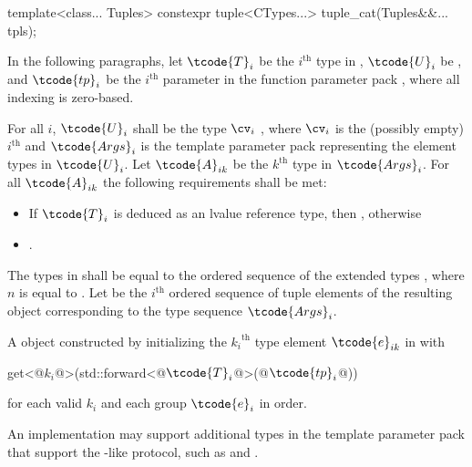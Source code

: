 \begin{itemdecl}
template<class... Tuples>
  constexpr tuple<CTypes...> tuple_cat(Tuples&&... tpls);
\end{itemdecl}

\begin{itemdescr}
\pnum
In the following paragraphs, let $\tcode{T}_i$ be the $i^\text{th}$ type in ,
$\tcode{U}_i$ be , and $\tcode{tp}_i$ be the $i^\text{th}$
parameter in the function parameter pack , where all indexing is
zero-based.

\pnum
\requires For all $i$, $\tcode{U}_i$ shall be the type
$\cv_i$ , where $\cv_i$ is the (possibly empty) $i^\text{th}$
 and $\tcode{Args}_i$ is the template parameter pack representing the element
types in $\tcode{U}_i$. Let $\tcode{A}_{ik}$ be the ${k}^\text{th}$ type in $\tcode{Args}_i$. For all
$\tcode{A}_{ik}$ the following requirements shall be met:
\begin{itemize}
\item If $\tcode{T}_i$ is deduced as an lvalue reference type, then
      , otherwise
\item {}.
\end{itemize}

\pnum
\remarks
The types in  shall be equal to the ordered
sequence of the extended types
,
where $n$ is
equal to . Let  be the $i^\text{th}$
ordered sequence of tuple elements of the resulting  object
corresponding to the type sequence $\tcode{Args}_i$.

\pnum
\returns
A  object constructed by initializing the ${k_i}^\text{th}$
type element $\tcode{e}_{ik}$ in  with
\begin{codeblock}
get<@$k_i$@>(std::forward<@$\tcode{T}_i$@>(@$\tcode{tp}_i$@))
\end{codeblock}
for each valid $k_i$ and each group $\tcode{e}_i$ in order.

\pnum
\begin{note}
An implementation may support additional types in the template parameter
pack  that support the -like protocol, such as
 and .
\end{note}
\end{itemdescr}


